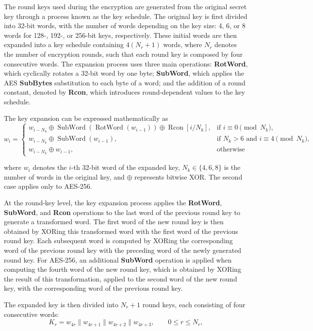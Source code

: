 The round keys used during the encryption are generated from the original secret key through a process known as the key schedule. The original key is first divided into 32-bit words, with the number of words depending on the key size: 4, 6, or 8 words for 128-, 192-, or 256-bit keys, respectively. These initial words are then expanded into a key schedule containing \(4(N_r+1)\) words, where \(N_r\) denotes the number of encryption rounds, such that each round key is composed by four consecutive words. The expansion process uses three main operations: \textbf{RotWord}, which cyclically rotates a 32-bit word by one byte; \textbf{SubWord}, which applies the AES \textbf{SubBytes} substitution to each byte of a word; and the addition of a round constant, denoted by \textbf{Rcon}, which introduces round-dependent values to the key schedule. 

The key expansion can be expressed mathematically as
\[
w_i =
\begin{cases}
w_{i-N_k} \oplus \operatorname{SubWord}(\operatorname{RotWord}(w_{i-1})) \oplus \operatorname{Rcon}[i/N_k], & \text{if } i \equiv 0 \pmod{N_k},\\[6pt]
w_{i-N_k} \oplus \operatorname{SubWord}(w_{i-1}), & \text{if } N_k > 6 \text{ and } i \equiv 4 \pmod{N_k},\\[6pt]
w_{i-N_k} \oplus w_{i-1}, & \text{otherwise}
\end{cases}
\]

where \(w_i\) denotes the \(i\)-th 32-bit word of the expanded key, \(N_k\in\{4,6,8\}\) is the number of words in the original key, and \(\oplus\) represents bitwise XOR. The second case applies only to AES-256.

At the round-key level, the key expansion process applies the \textbf{RotWord}, \textbf{SubWord}, and \textbf{Rcon} operations to the last word of the previous round key to generate a transformed word. The first word of the new round key is then obtained by XORing this transformed word with the first word of the previous round key. Each subsequent word is computed by XORing the corresponding word of the previous round key with the preceding word of the newly generated round key. For AES-256, an additional \textbf{SubWord} operation is applied when computing the fourth word of the new round key, which is obtained by XORing the result of this transformation, applied to the second word of the new round key, with the corresponding word of the previous round key.

The expanded key is then divided into \(N_r+1\) round keys, each consisting of four consecutive words:
\[
K_r = w_{4r}\parallel w_{4r+1}\parallel w_{4r+2}\parallel w_{4r+3},
\qquad 0\le r\le N_r,
\]


